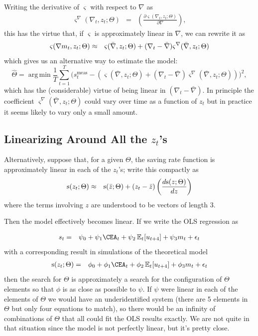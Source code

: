 \documentclass[titlepage]{\econtex}
\DeclareMathOperator*{\argmin}{arg\,min}
\begin{document}
Writing the derivative of $\varsigma$ with respect to $\nabla$ as
\begin{eqnarray}
  \varsigma^{\nabla}(\nabla_{t},z_{t};\Theta) & = & \left(\frac{\partial \varsigma(\nabla_{t},z_{t};\Theta)}{\partial \nabla}\right),
\end{eqnarray}
this has the virtue that, if $\varsigma$ is approximately linear in $\nabla$, we can rewrite it as
\begin{eqnarray}
  \varsigma(\nabla m_{t},z_{t};\Theta) & \approx & \varsigma(\bar{\nabla},z_{t};\Theta) + (\nabla_{t} - \bar{\nabla})\varsigma^{\nabla}(\bar{\nabla},z_{t};\Theta)
\end{eqnarray}
which gives us an alternative way to estimate the model:
\begin{equation}
  \hat{\Theta}=\argmin \frac{1}{T}\sum_{t=1}^T\bigg(s_{t}^{\text{meas}}-\left(\varsigma(\bar{\nabla},z_{t};\Theta)+(\nabla_{t} - \bar{\nabla})\varsigma^{\nabla}(\bar{\nabla},z_{t};\Theta)\right)  \bigg)^2, \label{minDistvarsigma}
\end{equation}
which has the (considerable) virtue of being linear in $(\nabla_{t}-\bar{\nabla})$.  In principle the coefficient $\varsigma^{\nabla}(\bar{\nabla},z_{t};\Theta)$ could vary over time as a function of $z_{t}$ but in practice it seems likely to vary only a small amount.


\subsection{Linearizing Around All the $z_{t}$'s}

Alternatively, suppose that, for a given $\Theta$, the saving rate function is approximately linear in each of the $z_{t}$'s; write this compactly as
\begin{eqnarray}
  \mathrm{s}(z_{t};\Theta) & \approx & \mathrm{s}(\bar{z};\Theta)+(z_{t}-\bar{z})\left(\frac{d \mathrm{s}(z;\Theta)}{d z}\right)
\end{eqnarray}
where the terms involving $z$ are understood to be vectors of length 3.

Then the model effectively becomes linear.  If we write the OLS regression as

\begin{eqnarray}
  s_{t} & = & \psi_{0} + \psi_{1} \CEA_{t} + \psi_{2} \Ex_{t}[u_{t+4}] + \psi_{3} \mRat_{t} + \epsilon_{t}
\end{eqnarray}
with a corresponding result in simulations of the theoretical model
\begin{eqnarray}
  \sFunc(z_{t};\Theta) & = & \phi_{0} + \phi_{1} \CEA_{t} + \phi_{2} \Ex_{t}[u_{t+4}] + \phi_{3} \mRat_{t} + \epsilon_{t}
\end{eqnarray}
then the search for $\Theta$ is approximately a search for the configuration of $\Theta$ elements so that $\phi$ is as close as possible to $\psi$.  If $\psi$ were linear in each of the elements of $\Theta$ we would have an underidentified system (there are 5 elements in $\Theta$ but only four equations to match), so there would be an infinity of combinations of $\Theta$ that all could fit the OLS results exactly.  We are not quite in that situation since the model is not perfectly linear, but it's pretty close.
\end{document}
